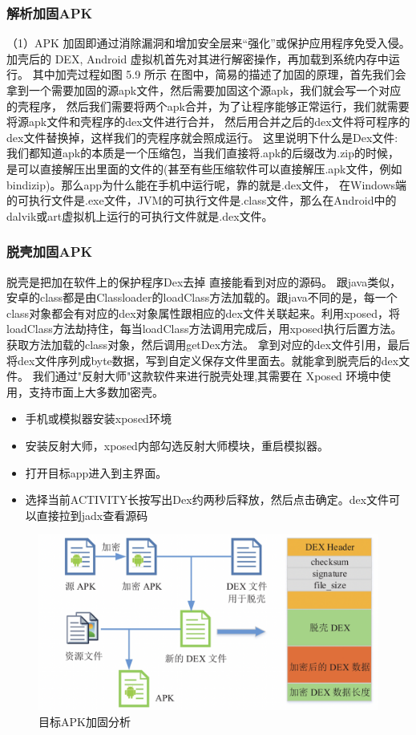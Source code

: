 \subsubsection{解析加固APK}
（1）APK 加固即通过消除漏洞和增加安全层来“强化”或保护应用程序免受入侵。加壳后的 DEX, Android 虚拟机首先对其进行解密操作，再加载到系统内存中运行。
其中加壳过程如图 5.9 所示
在图中，简易的描述了加固的原理，首先我们会拿到一个需要加固的源apk文件，然后需要加固这个源apk，我们就会写一个对应的壳程序，
然后我们需要将两个apk合并，为了让程序能够正常运行，我们就需要将源apk文件和壳程序的dex文件进行合并，
然后用合并之后的dex文件将可程序的dex文件替换掉，这样我们的壳程序就会照成运行。
这里说明下什么是Dex文件:
我们都知道apk的本质是一个压缩包，当我们直接将.apk的后缀改为.zip的时候，是可以直接解压出里面的文件的(甚至有些压缩软件可以直接解压.apk文件，例如bindizip)。那么app为什么能在手机中运行呢，靠的就是.dex文件，
在Windows端的可执行文件是.exe文件，JVM的可执行文件是.class文件，那么在Android中的dalvik或art虚拟机上运行的可执行文件就是.dex文件。
\subsubsection{脱壳加固APK}
脱壳是把加在软件上的保护程序Dex去掉 直接能看到对应的源码。
跟java类似，安卓的class都是由Classloader的loadClass方法加载的。跟java不同的是，每一个class对象都会有对应的dex对象属性跟相应的dex文件关联起来。利用xposed，将loadClass方法劫持住，每当loadClass方法调用完成后，用xposed执行后置方法。获取方法加载的class对象，然后调用getDex方法。
拿到对应的dex文件引用，最后将dex文件序列成byte数据，写到自定义保存文件里面去。就能拿到脱壳后的dex文件。
我们通过"反射大师"这款软件来进行脱壳处理,其需要在 Xposed 环境中使用，支持市面上大多数加密壳。
\begin{itemize}
  \item 手机或模拟器安装xposed环境
  \item 安装反射大师，xposed内部勾选反射大师模块，重启模拟器。
  \item 打开目标app进入到主界面。
  \item 选择当前ACTIVITY长按写出Dex约两秒后释放，然后点击确定。dex文件可以直接拉到jadx查看源码
\end{itemize}

\begin{figure}
  \centering
  \includegraphics[scale=0.5]{resources/img/i24.png}
  \caption{目标APK加固分析}
\end{figure}

